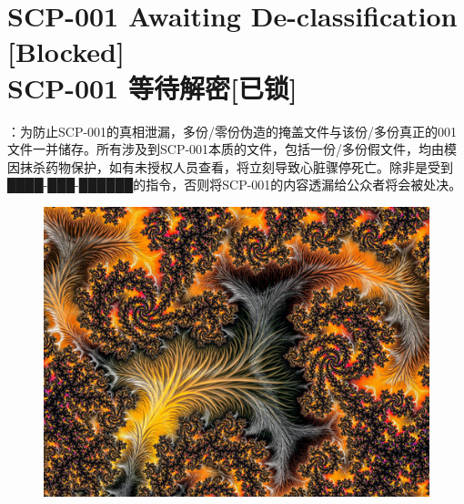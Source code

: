 \chapter[{SCP-001 等待解密[已锁]}]{
	SCP-001 Awaiting De-classification [Blocked] \\
	SCP-001 等待解密[已锁]
}

\label{chap:SCP-001.0}


\hr

\begin{scpboxbr}
：为防止SCP-001的真相泄漏，多份/零份伪造的掩盖文件与该份/多份真正的001文件一并储存。所有涉及到SCP-001本质的文件，包括一份/多份假文件，均由模因抹杀药物保护，如有未授权人员查看，将立刻导致心脏骤停死亡。除非是受到████-███-██████的指令，否则将SCP-001的内容透漏给公众者将会被处决。
\end{scpboxbr}

\hr


\hr

\newpage

\begin{figure}[H]
	\centering
	\includegraphics[width=\textwidth]{images/SCP-001-0.jpg}
\end{figure}

